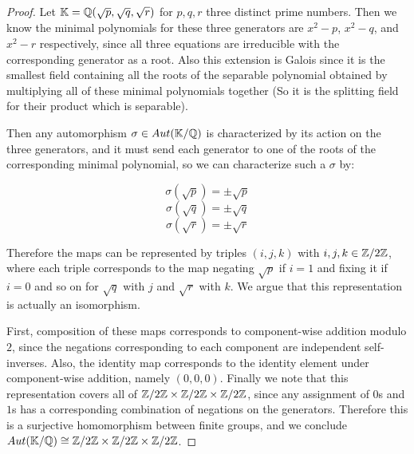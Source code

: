 \documentclass[11pt]{article}
\begin{document}
\begin{proof}
  Let $\mathbb{K} = \mathbb{Q}(\sqrt p, \sqrt q, \sqrt r)$ for $p,q,r$ three distinct prime numbers.
  Then we know the minimal polynomials for these three generators are $x^2 - p$, $x^2 - q$, and $x^2 - r$ respectively, since all three equations are irreducible with the corresponding generator as a root.
  Also this extension is Galois since it is the smallest field containing all the roots of the separable polynomial obtained by multiplying all of these minimal polynomials together (So it is the splitting field for their product which is separable).
  
  Then any automorphism $\sigma \in Aut(\mathbb{K}/\mathbb{Q})$ is characterized by its action on the three generators, and it must send each generator to one of the roots of the corresponding minimal polynomial, so we can characterize such a $\sigma$ by:
  \begin{multicols}{3}
    \noindent
    \begin{equation*}
      \sigma(\sqrt p) = \pm \sqrt p
    \end{equation*}
    \noindent
    \begin{equation*}
      \sigma(\sqrt q) = \pm \sqrt q
    \end{equation*}
    \noindent
    \begin{equation*}
      \sigma(\sqrt r) = \pm \sqrt r
    \end{equation*}
  \end{multicols}
  Therefore the maps can be represented by triples $(i,j,k)$ with $i,j,k \in \mathbb{Z}/2\mathbb{Z}$, where each triple corresponds to the map negating $\sqrt p$ if $i = 1$ and fixing it if $i = 0$ and so on for $\sqrt q$ with $j$ and $\sqrt r$ with $k$.
  We argue that this representation is actually an isomorphism.
  
  First, composition of these maps corresponds to component-wise addition modulo $2$, since the negations corresponding to each component are independent self-inverses.
  Also, the identity map corresponds to the identity element under component-wise addition, namely $(0,0,0)$.
  Finally we note that this representation covers all of $\mathbb{Z}/2\mathbb{Z} \times \mathbb{Z}/2\mathbb{Z} \times \mathbb{Z}/2\mathbb{Z}$, since any assignment of $0$s and $1$s has a corresponding combination of negations on the generators.
  Therefore this is a surjective homomorphism between finite groups, and we conclude $Aut(\mathbb{K}/\mathbb{Q}) \cong \mathbb{Z}/2\mathbb{Z} \times \mathbb{Z}/2\mathbb{Z} \times \mathbb{Z}/2\mathbb{Z}$.
\end{proof}
\end{document}
